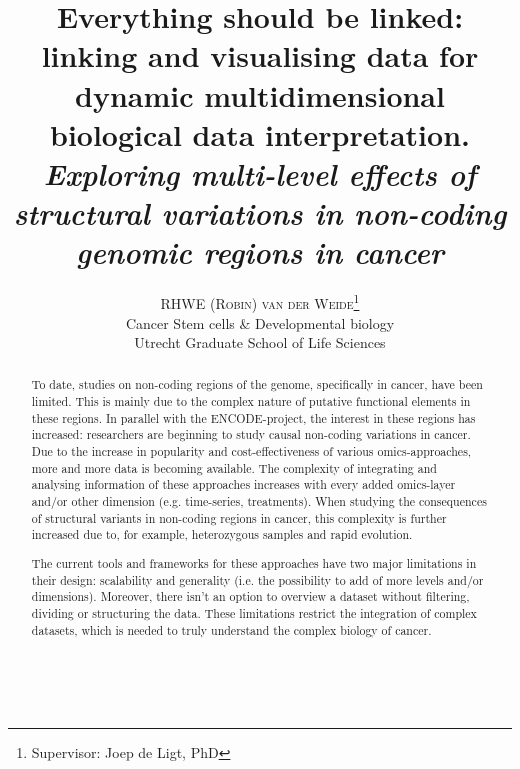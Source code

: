 \documentclass[twoside,fontsize=10pt]{article}
\title{\vspace{-15mm}\fontsize{18pt}{10pt}\normalfont\textbf{Everything should be linked: linking and visualising data for dynamic  multidimensional biological data interpretation.\\ \vspace{4 mm} {{\footnotesize \textit{Exploring multi-level effects of structural variations in non-coding genomic regions in cancer}}}}} %
\author{
\large
\textsc{RHWE (Robin) van der Weide}\thanks{Supervisor: Joep de Ligt, PhD}\\[2mm] %
\normalsize   Cancer Stem cells \& Developmental biology \\ %
\normalsize  Utrecht Graduate School of Life Sciences \\ %
\vspace{-5mm}
}
\date{}
\renewcommand{\abstractname}{}    %
\begin{document}
\maketitle %

\thispagestyle{fancy} %

\newpage
\mbox{   }
\newpage
\renewcommand{\abstractname}{\begin{center}
Summary of the research
\end{center}}    %
\begin{abstract}
\noindent
To date, studies on non-coding regions of the genome, specifically in cancer, have been limited. This is mainly due to the complex nature of putative functional elements in these regions. In parallel with the ENCODE-project, the interest in these regions has increased: researchers are beginning to study causal non-coding variations in cancer. Due to the increase in popularity and cost-effectiveness of various omics-approaches, more and more data is becoming available. The complexity of integrating and analysing information of these approaches increases with every added omics-layer and/or other dimension (e.g. time-series, treatments). When studying the consequences of structural variants in non-coding regions in cancer, this complexity is further increased due to, for example, heterozygous samples and rapid evolution.
\medskip

\noindent
 The current tools and frameworks for these approaches have two major limitations in their design: scalability and generality (i.e. the possibility to add of more levels and/or dimensions). Moreover, there isn't an option to overview a dataset without filtering, dividing or structuring the data. These limitations restrict the integration of complex datasets, which is needed to truly understand the complex biology of cancer.
\medskip


\end{abstract}
\end{document}
